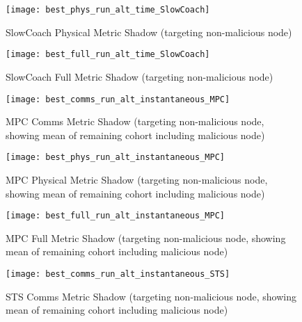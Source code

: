 \documentclass[aspectratio=169]{beamer}
\begin{document}
\begin{frame}\begin{figure}[h]
	\centering
	\texttt{[image: best\_phys\_run\_alt\_time\_SlowCoach]}
	\caption{SlowCoach Physical Metric Shadow (targeting non-malicious node)}
	\label{fig:phys_alt_time_slowcoach}
\end{figure}\end{frame}

\begin{frame}\begin{figure}[h]
	\centering
	\texttt{[image: best\_full\_run\_alt\_time\_SlowCoach]}
	\caption{SlowCoach Full Metric Shadow (targeting non-malicious node)}
	\label{fig:full_alt_time_slowcoach}
\end{figure}\end{frame}

\begin{frame}\begin{figure}[h]
	\centering
	\texttt{[image: best\_comms\_run\_alt\_instantaneous\_MPC]}
	\caption{MPC Comms Metric Shadow (targeting non-malicious node, showing mean of remaining cohort including malicious node)}
	\label{fig:comms_alt_instantaneous_mpc}
\end{figure}\end{frame}

\begin{frame}\begin{figure}[h]
	\centering
	\texttt{[image: best\_phys\_run\_alt\_instantaneous\_MPC]}
	\caption{MPC Physical Metric Shadow (targeting non-malicious node, showing mean of remaining cohort including malicious node)}
	\label{fig:phys_alt_instantaneous_mpc}
\end{figure}\end{frame}

\begin{frame}\begin{figure}[h]
	\centering
	\texttt{[image: best\_full\_run\_alt\_instantaneous\_MPC]}
	\caption{MPC Full Metric Shadow (targeting non-malicious node, showing mean of remaining cohort including malicious node)}
	\label{fig:full_alt_instantaneous_mpc}
\end{figure}\end{frame}


\begin{frame}\begin{figure}[h]
	\centering
	\texttt{[image: best\_comms\_run\_alt\_instantaneous\_STS]}
	\caption{STS Comms Metric Shadow (targeting non-malicious node, showing mean of remaining cohort including malicious node)}
	\label{fig:comms_alt_instantaneous_sts}
\end{figure}\end{frame}
\end{document}
